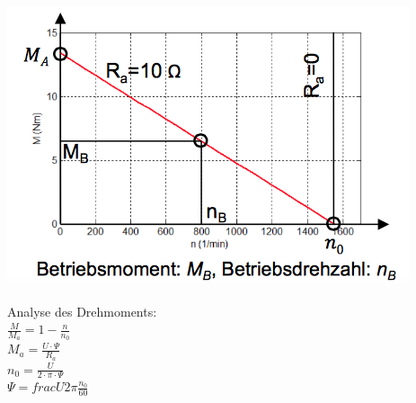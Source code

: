 \begin{minipage}{0.4 \linewidth}
\includegraphics[width = \linewidth]{./Pics/VL45/Nebenschluss2}
\end{minipage}
\begin{minipage}{0.6 \linewidth}
Analyse des Drehmoments: \\

$\frac{M}{M_a} = 1 - \frac{n}{n_0}$\\

$M_a = \frac{U \cdot \Psi}{R_a}$\\

$n_0 = \frac{U}{2 \cdot \pi \cdot \Psi}$ \\

$\Psi = frac{U}{2 \pi \frac{n_0}{60}} $ 
\end{minipage}

